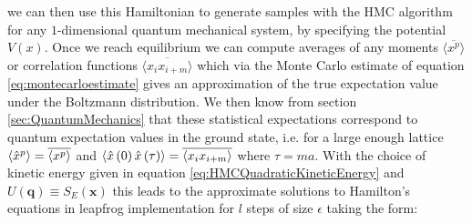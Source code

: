 \documentclass[12pt]{article}
\begin{document}
    we can then use this Hamiltonian to generate samples with the HMC algorithm for any $1$-dimensional quantum mechanical system, by specifying the potential $V\left(x\right)$. Once we reach equilibrium we can compute averages of any moments $\overline{\langle x^p \rangle}$ or correlation functions $\overline{\langle x_ix_{i+m} \rangle}$ which via the Monte Carlo estimate of equation \ref{eq:montecarloestimate} gives an approximation of the true expectation value under the Boltzmann distribution. We then know from section \ref{sec:QuantumMechanics} that these statistical expectations correspond to quantum expectation values in the ground state, i.e. for a large enough lattice $\braket{\hat{x}^p}=\overline{\langle x^p \rangle}$ and $\braket{\hat{x}\left(0\right)\hat{x}\left(\tau\right)}=\overline{\langle x_ix_{i+m} \rangle}$ where $\tau=ma$.  With the choice of kinetic energy given in equation \ref{eq:HMCQuadraticKineticEnergy} and $U\left(\bm{q}\right) \equiv S_E\left(\bm{x}\right)$ this leads to the approximate solutions to Hamilton's equations in leapfrog implementation for $l$ steps of size $\epsilon$ taking the form:
\end{document}
